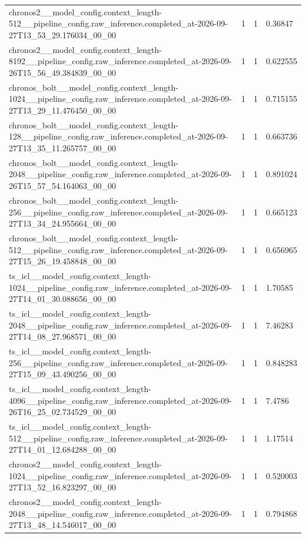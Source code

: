 \begin{tabular}{llll}
chronos2\_\_model\_config.context\_length-512\_\_pipeline\_config.raw\_inference.completed\_at-2026-09-27T13\_53\_29.176034\_00\_00 & 1 & 1 & 0.36847 \\
chronos2\_\_model\_config.context\_length-8192\_\_pipeline\_config.raw\_inference.completed\_at-2026-09-26T15\_56\_49.384839\_00\_00 & 1 & 1 & 0.622555 \\
chronos\_bolt\_\_model\_config.context\_length-1024\_\_pipeline\_config.raw\_inference.completed\_at-2026-09-27T13\_29\_11.476450\_00\_00 & 1 & 1 & 0.715155 \\
chronos\_bolt\_\_model\_config.context\_length-128\_\_pipeline\_config.raw\_inference.completed\_at-2026-09-27T13\_35\_11.265757\_00\_00 & 1 & 1 & 0.663736 \\
chronos\_bolt\_\_model\_config.context\_length-2048\_\_pipeline\_config.raw\_inference.completed\_at-2026-09-26T15\_57\_54.164063\_00\_00 & 1 & 1 & 0.891024 \\
chronos\_bolt\_\_model\_config.context\_length-256\_\_pipeline\_config.raw\_inference.completed\_at-2026-09-27T13\_34\_24.955664\_00\_00 & 1 & 1 & 0.665123 \\
chronos\_bolt\_\_model\_config.context\_length-512\_\_pipeline\_config.raw\_inference.completed\_at-2026-09-27T15\_26\_19.458848\_00\_00 & 1 & 1 & 0.656965 \\
ts\_icl\_\_model\_config.context\_length-1024\_\_pipeline\_config.raw\_inference.completed\_at-2026-09-27T14\_01\_30.088656\_00\_00 & 1 & 1 & 1.70585 \\
ts\_icl\_\_model\_config.context\_length-2048\_\_pipeline\_config.raw\_inference.completed\_at-2026-09-27T14\_08\_27.968571\_00\_00 & 1 & 1 & 7.46283 \\
ts\_icl\_\_model\_config.context\_length-256\_\_pipeline\_config.raw\_inference.completed\_at-2026-09-27T15\_09\_43.490256\_00\_00 & 1 & 1 & 0.848283 \\
ts\_icl\_\_model\_config.context\_length-4096\_\_pipeline\_config.raw\_inference.completed\_at-2026-09-26T16\_25\_02.734529\_00\_00 & 1 & 1 & 7.4786 \\
ts\_icl\_\_model\_config.context\_length-512\_\_pipeline\_config.raw\_inference.completed\_at-2026-09-27T14\_01\_12.684288\_00\_00 & 1 & 1 & 1.17514 \\
chronos2\_\_model\_config.context\_length-1024\_\_pipeline\_config.raw\_inference.completed\_at-2026-09-27T13\_52\_16.823297\_00\_00 & 1 & 1 & 0.520003 \\
chronos2\_\_model\_config.context\_length-2048\_\_pipeline\_config.raw\_inference.completed\_at-2026-09-27T13\_48\_14.546017\_00\_00 & 1 & 1 & 0.794868 \\

\end{tabular}
